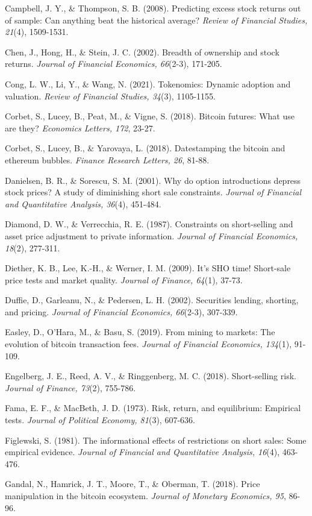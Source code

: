 \documentclass[
]{article}
\begin{document}
Campbell, J. Y., \& Thompson, S. B. (2008). Predicting excess stock
returns out of sample: Can anything beat the historical average?
\emph{Review of Financial Studies, 21}(4), 1509-1531.

Chen, J., Hong, H., \& Stein, J. C. (2002). Breadth of ownership and
stock returns. \emph{Journal of Financial Economics, 66}(2-3), 171-205.

Cong, L. W., Li, Y., \& Wang, N. (2021). Tokenomics: Dynamic adoption
and valuation. \emph{Review of Financial Studies, 34}(3), 1105-1155.

Corbet, S., Lucey, B., Peat, M., \& Vigne, S. (2018). Bitcoin futures:
What use are they? \emph{Economics Letters, 172}, 23-27.

Corbet, S., Lucey, B., \& Yarovaya, L. (2018). Datestamping the bitcoin
and ethereum bubbles. \emph{Finance Research Letters, 26}, 81-88.

Danielsen, B. R., \& Sorescu, S. M. (2001). Why do option introductions
depress stock prices? A study of diminishing short sale constraints.
\emph{Journal of Financial and Quantitative Analysis, 36}(4), 451-484.

Diamond, D. W., \& Verrecchia, R. E. (1987). Constraints on
short-selling and asset price adjustment to private information.
\emph{Journal of Financial Economics, 18}(2), 277-311.

Diether, K. B., Lee, K.-H., \& Werner, I. M. (2009). It's SHO time!
Short-sale price tests and market quality. \emph{Journal of Finance,
64}(1), 37-73.

Duffie, D., Garleanu, N., \& Pedersen, L. H. (2002). Securities lending,
shorting, and pricing. \emph{Journal of Financial Economics, 66}(2-3),
307-339.

Easley, D., O'Hara, M., \& Basu, S. (2019). From mining to markets: The
evolution of bitcoin transaction fees. \emph{Journal of Financial
Economics, 134}(1), 91-109.

Engelberg, J. E., Reed, A. V., \& Ringgenberg, M. C. (2018).
Short-selling risk. \emph{Journal of Finance, 73}(2), 755-786.

Fama, E. F., \& MacBeth, J. D. (1973). Risk, return, and equilibrium:
Empirical tests. \emph{Journal of Political Economy, 81}(3), 607-636.

Figlewski, S. (1981). The informational effects of restrictions on short
sales: Some empirical evidence. \emph{Journal of Financial and
Quantitative Analysis, 16}(4), 463-476.

Gandal, N., Hamrick, J. T., Moore, T., \& Oberman, T. (2018). Price
manipulation in the bitcoin ecosystem. \emph{Journal of Monetary
Economics, 95}, 86-96.
\end{document}
